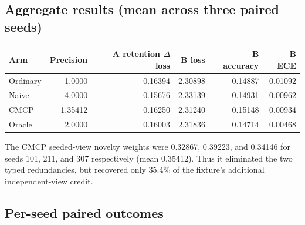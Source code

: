 \documentclass[10pt]{article}
\begin{document}
\subsection*{Aggregate results (mean across three paired seeds)}

\begin{center}
\small
\begin{tabular}{lrrrrr}
\toprule
Arm & Precision & A retention $\Delta$ loss & B loss & B accuracy & B ECE \\
\midrule
Ordinary & 1.0000 & 0.16394 & 2.30898 & 0.14887 & 0.01092 \\
Naive & 4.0000 & 0.15676 & 2.33139 & 0.14931 & 0.00962 \\
CMCP & 1.35412 & 0.16250 & 2.31240 & 0.15148 & 0.00934 \\
Oracle & 2.0000 & 0.16003 & 2.31836 & 0.14714 & 0.00468 \\
\bottomrule
\end{tabular}
\end{center}

The CMCP seeded-view novelty weights were 0.32867, 0.39223, and 0.34146 for
seeds 101, 211, and 307 respectively (mean 0.35412). Thus it eliminated the
two typed redundancies, but recovered only 35.4\% of the fixture's additional
independent-view credit.

\subsection*{Per-seed paired outcomes}

\begin{center}
\small
{}
\end{center}
\end{document}
